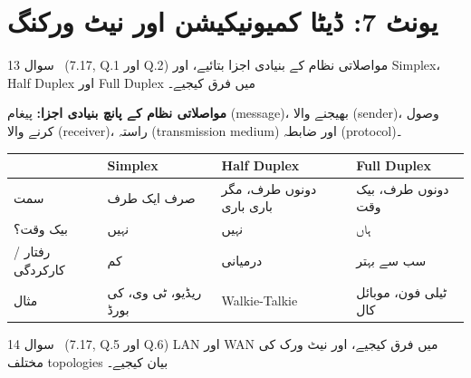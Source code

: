 \section*{یونٹ \textenglish{7}: ڈیٹا کمیونیکیشن اور نیٹ ورکنگ}

\begin{sawal}{سوال \textenglish{13} \ \textnormal{\small(\textenglish{7.17, Q.1} اور \textenglish{Q.2})}}
مواصلاتی نظام کے بنیادی اجزا بتائیے، اور \textenglish{Simplex}،
\textenglish{Half Duplex} اور \textenglish{Full Duplex} میں فرق کیجیے۔
\end{sawal}

\begin{hal}
\textbf{مواصلاتی نظام کے پانچ بنیادی اجزا:} پیغام (\textenglish{message})،
بھیجنے والا (\textenglish{sender})، وصول کرنے والا (\textenglish{receiver})،
راستہ (\textenglish{transmission medium}) اور ضابطہ
(\textenglish{protocol})۔

\medskip
\begin{center}
\begin{tabular}{@{}p{2.8cm} p{3.6cm} p{3.4cm} p{4.4cm}@{}}
\toprule
 & \textbf{\textenglish{Simplex}} & \textbf{\textenglish{Half Duplex}} & \textbf{\textenglish{Full Duplex}} \\
\midrule
سمت & صرف ایک طرف & دونوں طرف، مگر باری باری & دونوں طرف، بیک وقت \\
بیک وقت؟ & نہیں & نہیں & ہاں \\
رفتار / کارکردگی & کم & درمیانی & سب سے بہتر \\
مثال & ریڈیو، ٹی وی، کی بورڈ & \textenglish{Walkie-Talkie} & ٹیلی فون، موبائل کال \\
\bottomrule
\end{tabular}
\end{center}

\end{hal}

\begin{sawal}{سوال \textenglish{14} \ \textnormal{\small(\textenglish{7.17, Q.5} اور \textenglish{Q.6})}}
\textenglish{LAN} اور \textenglish{WAN} میں فرق کیجیے، اور نیٹ ورک کی مختلف
\textenglish{topologies} بیان کیجیے۔
\end{sawal}


